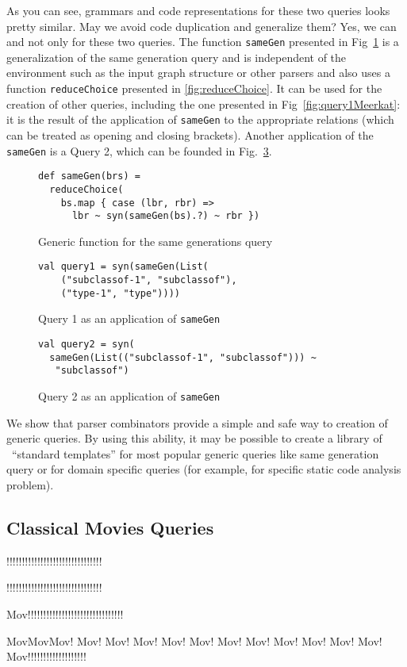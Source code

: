 As you can see, grammars and code representations for these two queries looks pretty similar.
May we avoid code duplication and generalize them? 
Yes, we can and not only for these two queries.
The function \lstinline{sameGen} presented in Fig~\ref{fig:gen} is a generalization of the same generation query and is independent of the environment such as the input graph structure or other parsers and also uses a function \lstinline{reduceChoice} presented in \ref{fig:reduceChoice}.
It can be used for the creation of other queries, including the one presented in Fig~\ref{fig:query1Meerkat}: it is the result of the application of \lstinline{sameGen} to the appropriate relations (which can be treated as opening and closing brackets).
Another application of the \lstinline{sameGen} is a Query 2, which can be founded in Fig.~\ref{fig:query2Gen}.


\begin{figure}[h]
\begin{lstlisting}
def sameGen(brs) =
  reduceChoice(
    bs.map { case (lbr, rbr) => 
      lbr ~ syn(sameGen(bs).?) ~ rbr }) 
\end{lstlisting}
\caption{Generic function for the same generations query}
\label{fig:gen}
\end{figure}


\begin{figure}[h]
\begin{lstlisting}
val query1 = syn(sameGen(List(
    ("subclassof-1", "subclassof"),
    ("type-1", "type"))))
\end{lstlisting}
\caption{Query 1 as an application of \lstinline{sameGen}}
\label{fig:query1Gen}
\end{figure}


\begin{figure}[h]
\begin{lstlisting}
val query2 = syn(
  sameGen(List(("subclassof-1", "subclassof"))) ~
   "subclassof")
\end{lstlisting}
\caption{Query 2 as an application of \lstinline{sameGen}}
\label{fig:query2Gen}
\end{figure}


We show that parser combinators provide a simple and safe way to creation of generic queries.
By using this ability, it may be possible to create a library of \ ``standard templates'' for most popular generic queries like same generation query or for domain specific queries (for example, for specific static code analysis problem).


\subsection{Classical Movies Queries}

!!!!!!!!!!!!!!!!!!!!!!!!!!!!!!!

!!!!!!!!!!!!!!!!!!!!!!!!!!!!!!!

Mov!!!!!!!!!!!!!!!!!!!!!!!!!!!!!!!

MovMovMov! Mov! Mov! Mov! Mov! Mov! Mov! Mov! Mov! Mov! Mov! Mov! Mov!!!!!!!!!!!!!!!!!!!